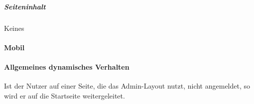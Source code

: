 \subparagraph*{Seiteninhalt}
Keines

\paragraph*{Mobil}

\paragraph*{Allgemeines dynamisches Verhalten}
Ist der Nutzer auf einer Seite, die das Admin-Layout nutzt, nicht angemeldet, so wird er auf die Startseite weitergeleitet.
